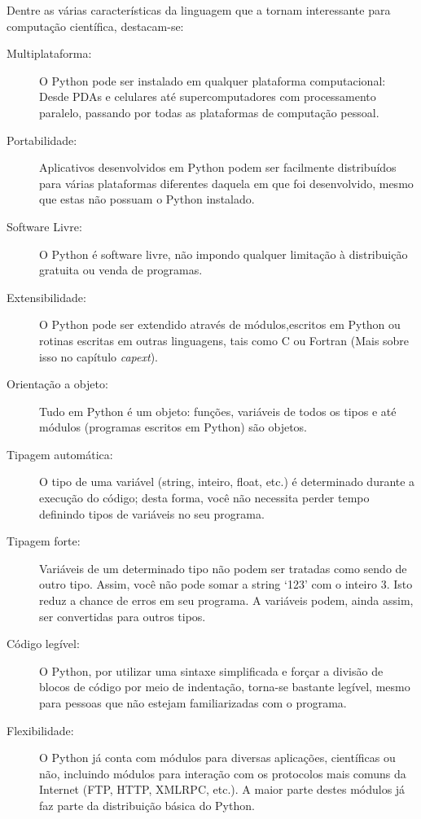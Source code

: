 \documentclass[a4paper,10pt,brazil]{sphinxmanual}
\begin{document}
Dentre as várias características da linguagem que a tornam interessante para computação científica, destacam-se:
\begin{description}
\item[{Multiplataforma:}] \leavevmode
O Python pode ser instalado em qualquer plataforma computacional: Desde PDAs e celulares até supercomputadores com processamento paralelo, passando por todas as plataformas de computação pessoal.

\item[{Portabilidade:}] \leavevmode
Aplicativos desenvolvidos em Python podem ser facilmente distribuídos para várias plataformas diferentes daquela em que foi desenvolvido, mesmo que estas não possuam o Python instalado.

\item[{Software Livre:}] \leavevmode
O Python é software livre, não impondo qualquer limitação à distribuição gratuita ou venda de programas.

\item[{Extensibilidade:}] \leavevmode
O Python pode ser extendido através de módulos,escritos em Python ou rotinas escritas em outras linguagens, tais como C ou Fortran (Mais sobre isso no capítulo \emph{capext}).

\item[{Orientação a objeto:}] \leavevmode
Tudo em Python é um objeto: funções, variáveis de todos os tipos e até módulos (programas escritos em Python) são objetos.

\item[{Tipagem automática:}] \leavevmode
O tipo de uma variável (string, inteiro, float, etc.) é determinado durante a execução do código; desta forma, você não necessita perder tempo definindo tipos de variáveis no seu programa.

\item[{Tipagem forte:}] \leavevmode
Variáveis de um determinado tipo não podem ser tratadas como sendo de outro tipo. Assim, você não pode somar a string `123' com o inteiro 3. Isto reduz a chance de erros em seu programa. A variáveis podem, ainda assim, ser convertidas para outros tipos.

\item[{Código legível:}] \leavevmode
O Python, por utilizar uma sintaxe simplificada e forçar a divisão de blocos de código por meio de indentação, torna-se bastante legível, mesmo para pessoas que não estejam familiarizadas com o programa.

\item[{Flexibilidade:}] \leavevmode
O Python já conta com módulos para diversas aplicações, científicas ou não, incluindo módulos para interação com os protocolos mais comuns da Internet (FTP, HTTP, XMLRPC, etc.). A maior parte destes módulos já faz parte da distribuição básica do Python.


\end{description}
\end{document}
